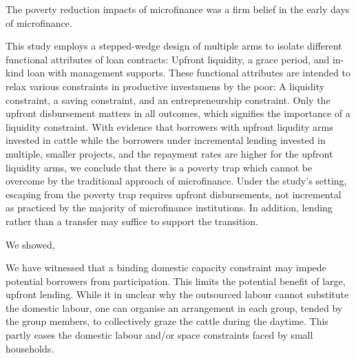 	The poverty reduction impacts of microfinance was a firm belief in the early days of microfinance. 

	This study employs a stepped-wedge design of multiple arms to isolate different functional attributes of loan contracts: Upfront liquidity, a grace period, and in-kind loan with management supports. These functional attributes are intended to relax various constraints in productive investsmens by the poor: A liquidity constraint, a saving constraint, and an entrepreneurship constraint. Only the upfront disbursement matters in all outcomes, which signifies the importance of a liquidity constraint. With evidence that borrowers with upfront liqudity arms invested in cattle while the borrowers under incremental lending invested in multiple, smaller projects, and the repayment rates are higher for the upfront liquidity arms, we conclude that there is a poverty trap which cannot be overcome by the traditional approach of microfinance. Under the study's setting, escaping from the poverty trap requires upfront disbursements, not incremental as practiced by the majority of microfinance institutions. In addition, lending rather than a transfer may suffice to support the transition. 

	We showed,  

	We have witnessed that a binding domestic capacity constraint may impede potential borrowers from participation. This limits the potential benefit of large, upfront lending.  While it in unclear why the outsourced labour cannot substitute the domestic labour, one can organise an arrangement in each group, tended by the group members, to collectively graze the cattle during the daytime. This partly eases the domestic labour and/or space constraints faced by small households. 

